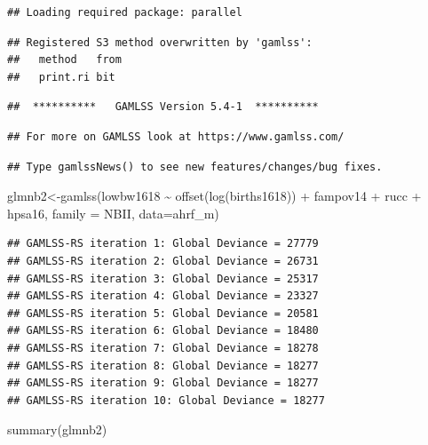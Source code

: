 \documentclass[
]{article}
\newenvironment{Shaded}{\begin{snugshade}}{\end{snugshade}}
\newcommand{\AttributeTok}[1]{\textcolor[rgb]{0.77,0.63,0.00}{#1}}
\newcommand{\FunctionTok}[1]{\textcolor[rgb]{0.00,0.00,0.00}{#1}}
\newcommand{\NormalTok}[1]{#1}
\newcommand{\OtherTok}[1]{\textcolor[rgb]{0.56,0.35,0.01}{#1}}
\newcommand{\SpecialCharTok}[1]{\textcolor[rgb]{0.00,0.00,0.00}{#1}}
\begin{document}
\begin{verbatim}
## Loading required package: parallel
\end{verbatim}

\begin{verbatim}
## Registered S3 method overwritten by 'gamlss':
##   method   from
##   print.ri bit
\end{verbatim}

\begin{verbatim}
##  **********   GAMLSS Version 5.4-1  **********
\end{verbatim}

\begin{verbatim}
## For more on GAMLSS look at https://www.gamlss.com/
\end{verbatim}

\begin{verbatim}
## Type gamlssNews() to see new features/changes/bug fixes.
\end{verbatim}

\begin{Shaded}
\begin{Highlighting}[]
\NormalTok{glmnb2}\OtherTok{\textless{}{-}}\FunctionTok{gamlss}\NormalTok{(lowbw1618 }\SpecialCharTok{\textasciitilde{}} \FunctionTok{offset}\NormalTok{(}\FunctionTok{log}\NormalTok{(births1618)) }\SpecialCharTok{+}\NormalTok{ fampov14 }\SpecialCharTok{+}\NormalTok{ rucc }\SpecialCharTok{+}\NormalTok{ hpsa16,}
               \AttributeTok{family =}\NormalTok{ NBII,}
               \AttributeTok{data=}\NormalTok{ahrf\_m)}
\end{Highlighting}
\end{Shaded}

\begin{verbatim}
## GAMLSS-RS iteration 1: Global Deviance = 27779 
## GAMLSS-RS iteration 2: Global Deviance = 26731 
## GAMLSS-RS iteration 3: Global Deviance = 25317 
## GAMLSS-RS iteration 4: Global Deviance = 23327 
## GAMLSS-RS iteration 5: Global Deviance = 20581 
## GAMLSS-RS iteration 6: Global Deviance = 18480 
## GAMLSS-RS iteration 7: Global Deviance = 18278 
## GAMLSS-RS iteration 8: Global Deviance = 18277 
## GAMLSS-RS iteration 9: Global Deviance = 18277 
## GAMLSS-RS iteration 10: Global Deviance = 18277
\end{verbatim}

\begin{Shaded}
\begin{Highlighting}[]
\FunctionTok{summary}\NormalTok{(glmnb2)}
\end{Highlighting}
\end{Shaded}
\end{document}
